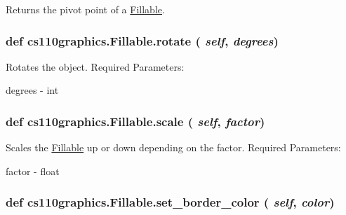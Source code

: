 Returns the pivot point of a \hyperlink{classcs110graphics_1_1Fillable}{Fillable}. \hypertarget{classcs110graphics_1_1Fillable_afa6710f6c314de39d19f06d9dd306d7d}{
\subsubsection[{rotate}]{\setlength{\rightskip}{0pt plus 5cm}def cs110graphics.Fillable.rotate ( {\em self}, \/   {\em degrees})}}
\label{classcs110graphics_1_1Fillable_afa6710f6c314de39d19f06d9dd306d7d}


Rotates the object. Required Parameters:
\begin{DoxyItemize}
\item degrees -\/ int 
\end{DoxyItemize}\hypertarget{classcs110graphics_1_1Fillable_a80d5b6b6d2ebae867dccecb803075749}{
\subsubsection[{scale}]{\setlength{\rightskip}{0pt plus 5cm}def cs110graphics.Fillable.scale ( {\em self}, \/   {\em factor})}}
\label{classcs110graphics_1_1Fillable_a80d5b6b6d2ebae867dccecb803075749}


Scales the \hyperlink{classcs110graphics_1_1Fillable}{Fillable} up or down depending on the factor. Required Parameters:
\begin{DoxyItemize}
\item factor -\/ float 
\end{DoxyItemize}\hypertarget{classcs110graphics_1_1Fillable_a2f830be5d970faac97759910d20d68a4}{
\subsubsection[{set\_\-border\_\-color}]{\setlength{\rightskip}{0pt plus 5cm}def cs110graphics.Fillable.set\_\-border\_\-color ( {\em self}, \/   {\em color})}}
\label{classcs110graphics_1_1Fillable_a2f830be5d970faac97759910d20d68a4}


